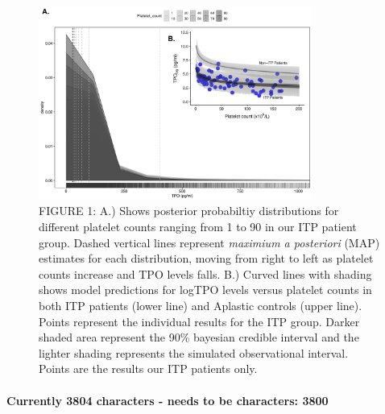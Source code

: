 \documentclass[11pt]{article}
\begin{document}

\begin{figure}
\includegraphics[width=0.8\textwidth]{ABSTRACT_v3_graph1.png}
\caption {FIGURE 1: A.) Shows posterior probabiltiy distributions for different platelet counts ranging from 1 to 90 in our ITP patient group. Dashed vertical lines represent \textit{maximium a posteriori} (MAP) estimates for each distribution, moving from right to left as platelet counts increase and TPO levels falls. B.) Curved lines with shading shows model predictions for logTPO levels versus platelet counts in both ITP patients (lower line) and Aplastic controls (upper line). Points represent the individual results for the ITP group. Darker shaded area represent the 90\% bayesian credible interval and the lighter shading represents the simulated observational interval. Points are the results our ITP patients only.}
\end{figure}





\paragraph{}
\textbf{Currently 3804 characters - needs to be characters: 3800}
\end{document}
